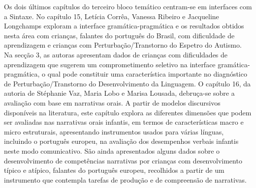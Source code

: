 \begin{refsection}
Os dois últimos capítulos do terceiro bloco temático centram-se em interfaces com a Sintaxe. No capítulo 15, Letícia Corrêa, Vanessa Ribeiro e Jacqueline Long\-champs exploram a interface gramática-pragmática e os resultados obtidos nesta área com crianças, falantes do português do Brasil, com dificuldade de aprendizagem e crianças com Perturbação/Transtorno do Espetro do Autismo. Na secção 3, as autoras apresentam dados de crianças com dificuldades de aprendizagem que sugerem um comprometimento seletivo na interface gramática-pragmática, o qual pode constituir uma característica importante no diagnóstico de Perturbação/Transtorno do Desenvolvimento da Linguagem. O capítulo 16, da autoria de Stéphanie Vaz, Maria Lobo e Marisa Lousada, debruça-se sobre a avaliação com base em narrativas orais. A partir de modelos discursivos disponíveis na literatura, este capítulo explora as diferentes dimensões que podem ser avaliadas nas narrativas orais infantis, em termos de características macro e micro estruturais, apresentando instrumentos usados para várias línguas, incluindo o português europeu, na avaliação dos desempenhos verbais infantis neste modo comunicativo. São ainda apresentados alguns dados sobre o desenvolvimento de competências narrativas por crianças com desenvolvimento típico e atípico, falantes do português europeu, recolhidos a partir de um instrumento que contempla tarefas de produção e de compreensão de narrativas. 


\end{refsection}
